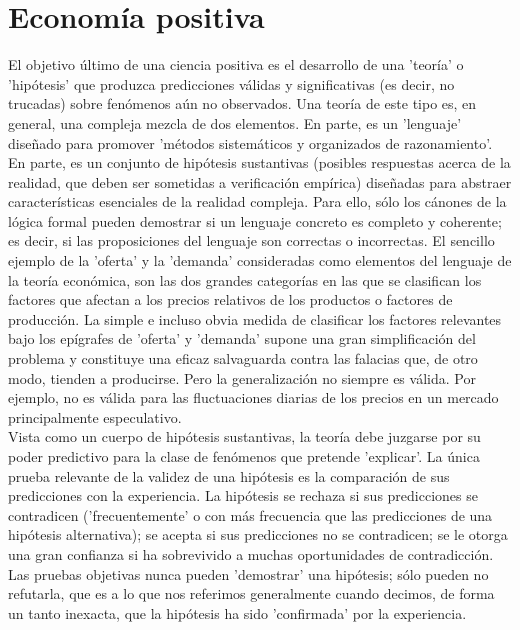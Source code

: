 \section{Economía positiva}
El objetivo último de una ciencia positiva es el desarrollo de una 'teoría' o 'hipótesis' que produzca predicciones válidas y significativas (es decir, no trucadas) sobre fenómenos aún no observados. Una teoría de este tipo es, en general, una compleja mezcla de dos elementos. En parte, es un 'lenguaje' diseñado para promover 'métodos sistemáticos y organizados de razonamiento'. En parte, es un conjunto de hipótesis sustantivas (posibles respuestas acerca de la realidad, que deben ser sometidas a verificación empírica) diseñadas para abstraer características esenciales de la realidad compleja. Para ello, sólo los cánones de la lógica formal pueden demostrar si un lenguaje concreto es completo y coherente; es decir, si las proposiciones del lenguaje son correctas o incorrectas. El sencillo ejemplo de la 'oferta' y la 'demanda' consideradas como elementos del lenguaje de la teoría económica, son las dos grandes categorías en las que se clasifican los factores que afectan a los precios relativos de los productos o factores de producción. La simple e incluso obvia medida de clasificar los factores relevantes bajo los epígrafes de 'oferta' y 'demanda' supone una gran simplificación del problema y constituye una eficaz salvaguarda contra las falacias que, de otro modo, tienden a producirse. Pero la generalización no siempre es válida. Por ejemplo, no es válida para las fluctuaciones diarias de los precios en un mercado principalmente especulativo.\\

Vista como un cuerpo de hipótesis sustantivas, la teoría debe juzgarse por su poder predictivo para la clase de fenómenos que pretende 'explicar'. La única prueba relevante de la validez de una hipótesis es la comparación de sus predicciones con la experiencia. La hipótesis se rechaza si sus predicciones se contradicen ('frecuentemente' o con más frecuencia que las predicciones de una hipótesis alternativa); se acepta si sus predicciones no se contradicen; se le otorga una gran confianza si ha sobrevivido a muchas oportunidades de contradicción. Las pruebas objetivas nunca pueden 'demostrar' una hipótesis; sólo pueden no refutarla, que es a lo que nos referimos generalmente cuando decimos, de forma un tanto inexacta, que la hipótesis ha sido 'confirmada' por la experiencia.\\

